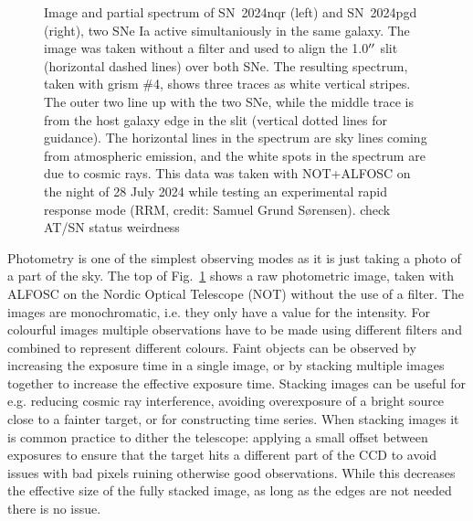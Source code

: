 \documentclass[a4paper,oneside,12pt, class=Latex/Classes/PhDthesisPSnPDF, crop=false]{standalone}
\begin{document}
\begin{figure}
    \caption{Image and partial spectrum of SN~2024nqr (left) and SN~2024pgd (right), two SNe Ia active simultaniously in the same galaxy. The image was taken without a filter and used to align the 1.0$^{\prime\prime}$ slit (horizontal dashed lines) over both SNe. The resulting spectrum, taken with grism \#4, shows three traces as white vertical stripes. The outer two line up with the two SNe, while the middle trace is from the host galaxy edge in the slit (vertical dotted lines for guidance). The horizontal lines in the spectrum are sky lines coming from atmospheric emission, and the white spots in the spectrum are due to cosmic rays. This data was taken with NOT+ALFOSC on the night of 28 July 2024 while testing an experimental rapid response mode (RRM, credit: Samuel Grund S\o rensen). \color{red}check AT/SN status weirdness \color{black}}
    \label{phot_spec_example}
\end{figure}


Photometry is one of the simplest observing modes as it is just taking a photo of a part of the sky. The top of Fig.~\ref{phot_spec_example} shows a raw photometric image, taken with ALFOSC on the Nordic Optical Telescope (NOT) without the use of a filter. The images are monochromatic, i.e. they only have a value for the intensity. For colourful images multiple observations have to be made using different filters and combined to represent different colours. Faint objects can be observed by increasing the exposure time in a single image, or by stacking multiple images together to increase the effective exposure time. Stacking images can be useful for e.g. reducing cosmic ray interference, avoiding overexposure of a bright source close to a fainter target, or for constructing time series. When stacking images it is common practice to dither the telescope: applying a small offset between exposures to ensure that the target hits a different part of the CCD to avoid issues with bad pixels ruining otherwise good observations. While this decreases the effective size of the fully stacked image, as long as the edges are not needed there is no issue.
\end{document}
